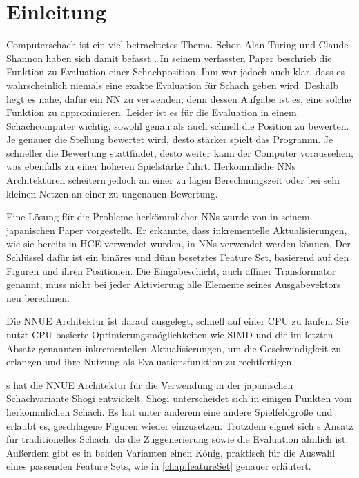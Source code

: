 \chapter{Einleitung}

Computerschach ist ein viel betrachtetes Thema. Schon Alan Turing und Claude Shannon haben sich damit befasst \cite{Turing1953, Shannon1950}. In seinem \citeyear{Shannon1950} verfassten Paper beschrieb \citeauthor{Shannon1950} \cite{Shannon1950} die Funktion zu Evaluation einer Schachposition. Ihm war jedoch auch klar, dass es wahrscheinlich niemals eine exakte Evaluation für Schach geben wird. Deshalb liegt es nahe, dafür ein \ac{NN} zu verwenden, denn dessen Aufgabe ist es, eine solche Funktion zu approximieren. Leider ist es für die Evaluation in einem Schachcomputer wichtig, sowohl genau als auch schnell die Position zu bewerten. Je genauer die Stellung bewertet wird, desto stärker spielt das Programm. Je schneller die Bewertung stattfindet, desto weiter kann der Computer voraussehen, was ebenfalls zu einer höheren Spielstärke führt. Herkömmliche \acp{NN} Architekturen scheitern jedoch an einer zu lagen Berechnungszeit oder bei sehr kleinen Netzen an einer zu ungenauen Bewertung.

Eine Lösung für die Probleme herkömmlicher \acp{NN} wurde \citeyear{YNasu2018} von \citeauthor{YNasu2018} \cite{YNasu2018} in seinem japanischen Paper vorgestellt. Er erkannte, dass inkrementelle Aktualisierungen, wie sie bereits in \ac{HCE} verwendet wurden, in \acp{NN} verwendet werden können. Der Schlüssel dafür ist ein binäres und dünn besetztes Feature Set, basierend auf den Figuren und ihren Positionen. Die Eingabeschicht, auch affiner Transformator genannt, muss nicht bei jeder Aktivierung alle Elemente seines Ausgabevektors neu berechnen.

Die \ac{NNUE} Architektur ist darauf ausgelegt, schnell auf einer CPU zu laufen. Sie nutzt CPU-basierte Optimierungsmöglichkeiten wie \ac{SIMD} und die im letzten Absatz genannten inkrementellen Aktualisierungen, um die Geschwindigkeit zu erlangen und ihre Nutzung als Evaluationsfunktion zu rechtfertigen.

\citeauthor{YNasu2018}s \cite{YNasu2018} hat die \ac{NNUE} Architektur für die Verwendung in der japanischen Schachvariante Shogi entwickelt. Shogi unterscheidet sich in einigen Punkten vom herkömmlichen Schach. Es hat unter anderem eine andere Spielfeldgröße und erlaubt es, geschlagene Figuren wieder einzusetzen. Trotzdem eignet sich \citeauthor{YNasu2018}s \cite{YNasu2018} Ansatz für traditionelles Schach, da die Zuggenerierung sowie die Evaluation ähnlich ist. Außerdem gibt es in beiden Varianten einen König, praktisch für die Auswahl eines passenden Feature Sets, wie in \autoref{chap:featureSet} genauer erläutert.

